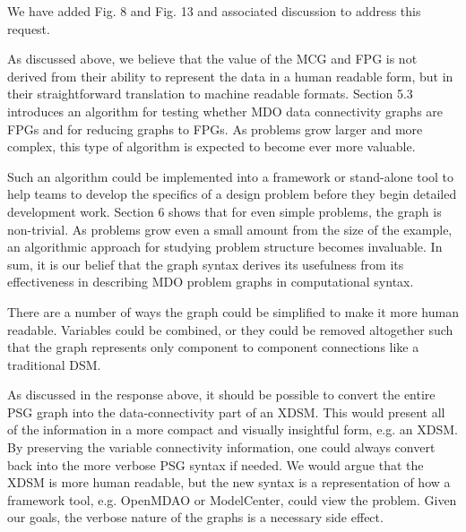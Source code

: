 \documentclass{article} %
\begin{document}

We have added  Fig. 8 and Fig. 13 and associated discussion to address this request.



As discussed above, we believe that the value of the MCG and FPG is not derived from their ability to represent the data in a human readable
form, but in their straightforward translation to machine readable formats. Section 5.3 introduces an
algorithm for testing whether MDO data connectivity graphs are FPGs and for reducing graphs to FPGs. As problems grow larger and more complex,
this type of algorithm is expected to become ever more valuable.

Such an algorithm could be implemented into a framework or stand-alone tool to help teams to develop the
specifics of a design problem before they begin detailed development work.
Section 6 shows that for even simple problems, the graph is
non-trivial. As problems grow even a small amount from the size of the example, an algorithmic approach for studying problem structure becomes invaluable. In sum, it is our belief that the graph syntax derives its usefulness from
its effectiveness in describing MDO problem graphs in computational syntax.


There are a number of ways the graph could be simplified to make it more human readable. Variables could be combined, or they could be removed altogether such that the graph represents only component to component connections like a traditional DSM.

As discussed in the response above, it should be possible to convert the entire PSG graph into the data-connectivity part of an XDSM. This would present all of the information in a more compact and visually insightful form, e.g. an XDSM. By preserving the variable connectivity information, one could always convert back into the more verbose PSG syntax  if needed.  We would argue that the XDSM is more human readable, but the new syntax is a representation of how a framework tool, e.g. OpenMDAO or ModelCenter, could view the problem.  Given our goals, the verbose nature of the graphs is a necessary side effect.
\end{document}
